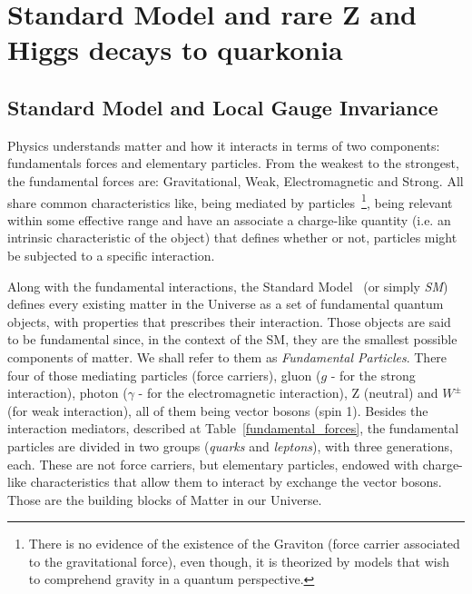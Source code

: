 \chapter{Standard Model and rare Z and Higgs decays to quarkonia}
\label{chaptertheory}

\section{Standard Model and Local Gauge Invariance}
\label{section_sm}

 
Physics understands matter and how it interacts in terms of two components: fundamentals forces and elementary particles. From the weakest to the strongest, the fundamental forces are: Gravitational, Weak, Electromagnetic and Strong. All share common characteristics like, being mediated by particles~\footnote{There is no evidence of the existence of the Graviton (force carrier associated to the gravitational force), even though, it is theorized by models that wish to comprehend gravity in a quantum perspective.}, being relevant within some effective range and have an associate a charge-like quantity (i.e. an intrinsic characteristic of the object) that defines whether or not, particles might be subjected to a specific interaction.

Along with the fundamental interactions, the Standard Model~\cite{burgess_moore_2006, oguri_qcd, Halzen:1984mc, Aitchison:2004cs} (or simply \textit{SM}) defines every existing matter in the Universe as a set of fundamental quantum objects, with properties that prescribes their interaction. Those objects are said to be fundamental since, in the context of the SM, they are the smallest possible components of matter. We shall refer to them as \textit{Fundamental Particles}. There four of those mediating particles (force carriers), gluon ($g$ - for the strong interaction), photon ($\gamma$ - for the electromagnetic interaction), Z (neutral) and $W^\pm$ (for weak interaction), all of them being vector bosons (spin 1). Besides the interaction mediators, described at Table~\ref{fundamental_forces}, the fundamental particles are divided in two groups (\textit{quarks} and \textit{leptons}), with three generations, each. These are not force carriers, but elementary particles, endowed with charge-like characteristics that allow them to interact by exchange the vector bosons. Those are the building blocks of Matter in our Universe.

